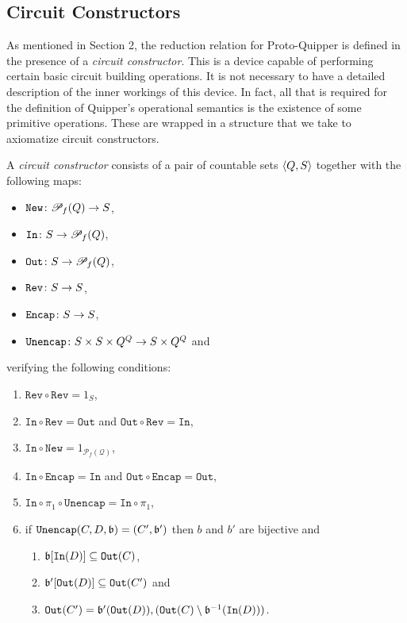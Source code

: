 \documentclass{article}
\begin{document}
\subsection{Circuit Constructors}

As mentioned in Section 2, the reduction relation for 
Proto-Quipper is defined in the presence of a \emph{circuit
constructor}. This is a device capable of 
performing certain basic circuit building operations. It is 
not necessary to have a detailed description of the inner 
workings of this device. In fact, all that is required for 
the definition of Quipper's operational semantics is the 
existence of some primitive operations. These are wrapped 
in a structure that we take to axiomatize circuit constructors. 

\begin{definition}
\label{circuit_constructor}
A \emph{circuit constructor} consists of a pair of countable sets $\langle Q,S\rangle$ 
together with the following maps:
\begin{itemize}
  \item $\mathtt{New}\colon {\mathscr{P}}_f(Q) \to S$,
  \item $\mathtt{In}\colon S\to {\mathscr{P}}_f(Q)$,
  \item $\mathtt{Out}\colon S\to {\mathscr{P}}_f(Q)$,
  \item $\mathtt{Rev}\colon S \to S$,
  \item $\mathtt{Encap}\colon S \to  S$,
  \item $\mathtt{Unencap}\colon S\times S\times Q^Q \to S \times Q^Q$ and
\end{itemize}
verifying the following conditions:
\begin{enumerate}
  \item $\mathtt{Rev}\circ\mathtt{Rev}=1_S$,
  \item $\mathtt{In}\circ\mathtt{Rev}= \mathtt{Out}$ and 
        $\mathtt{Out}\circ\mathtt{Rev}= \mathtt{In}$\label{in_out_rev},
  \item $\mathtt{In}\circ\mathtt{New} =1_{\mathcal{P}_f(\mathcal{Q})}$,
  \item $\mathtt{In}\circ \mathtt{Encap} =\mathtt{In}$ and $\mathtt{Out}\circ \mathtt{Encap} =\mathtt{Out}$,
  \item $\mathtt{In}\circ\pi_1\circ\mathtt{Unencap}=\mathtt{In}\circ\pi_1$,\label{Unencap_In}
  \item if $\mathtt{Unencap} (C,D,\mathfrak{b})=(C',\mathfrak{b}')$ then $b$ and $b'$ are bijective and\label{Unencap_cond}
    \begin{enumerate}
      \item $\mathfrak{b}[\mathtt{In}(D)]\subseteq \mathtt{Out} (C)$,\label{Unencap_cond_1}
      \item $\mathfrak{b}'[\mathtt{Out}(D)]\subseteq\mathtt{Out}(C')$ and\label{Unencap_cond_2}
      \item $\mathtt{Out}(C')=\mathfrak{b}'(\mathtt{Out}(D)),(\mathtt{Out}(C)\setminus\mathfrak{b}^{-1}(\mathtt{In}(D)))$.\label{Unencap_cond_3}
    \end{enumerate}
\end{enumerate}
\end{definition}
\end{document}
